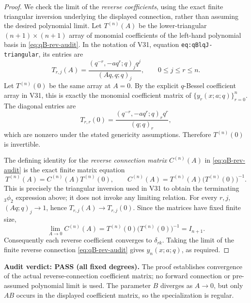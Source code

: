 \documentclass[11pt]{article}
\begin{document}
\begin{proof}
We check the limit of the \emph{reverse coefficients}, using the exact finite triangular inversion underlying the displayed connection, rather than assuming the desired polynomial limit. Let $T^{(n)}(A)$ be the lower-triangular $(n+1)\times(n+1)$ array of monomial coefficients of the left-hand polynomial basis in \eqref{eq:qB-rev-audit}. In the notation of V31, equation \texttt{eq:qBlqJ-triangular}, its entries are
\[
T_{r,j}(A)=\frac{(q^{-r},-aq^r;q)_j q^j}{(Aq,q;q)_j},\qquad 0\le j\le r\le n.
\]
Let $T^{(n)}(0)$ be the same array at $A=0$. By the explicit $q$-Bessel coefficient array in V31, this is exactly the monomial coefficient matrix of $\{y_r(x;a;q)\}_{r=0}^n$. The diagonal entries are
\[
T_{r,r}(0)=\frac{(q^{-r},-aq^r;q)_r q^r}{(q;q)_r},
\]
which are nonzero under the stated genericity assumptions. Therefore $T^{(n)}(0)$ is invertible.

The defining identity for the \emph{reverse connection matrix} $C^{(n)}(A)$ in \eqref{eq:qB-rev-audit} is the exact finite matrix equation
\[
T^{(n)}(A)=C^{(n)}(A)T^{(n)}(0),\qquad
C^{(n)}(A)=T^{(n)}(A)\bigl(T^{(n)}(0)\bigr)^{-1}.
\]
This is precisely the triangular inversion used in V31 to obtain the terminating ${}_3\phi_2$ expression above; it does not invoke any limiting relation. For every $r,j$, $(Aq;q)_j\to1$, hence $T_{r,j}(A)\to T_{r,j}(0)$. Since the matrices have fixed finite size,
\[
\lim_{A\to0}C^{(n)}(A)
=T^{(n)}(0)\bigl(T^{(n)}(0)\bigr)^{-1}=I_{n+1}.
\]
Consequently each reverse coefficient converges to $\delta_{rk}$. Taking the limit of the finite reverse connection \eqref{eq:qB-rev-audit} gives $y_n(x;a;q)$, as required.
\end{proof}
\noindent\textbf{Audit verdict: PASS (all fixed degrees).} The proof establishes convergence of the actual reverse-connection coefficient matrix; no forward connection or pre-assumed polynomial limit is used. The parameter $B$ diverges as $A\to0$, but only $AB$ occurs in the displayed coefficient matrix, so the specialization is regular.
\end{document}
